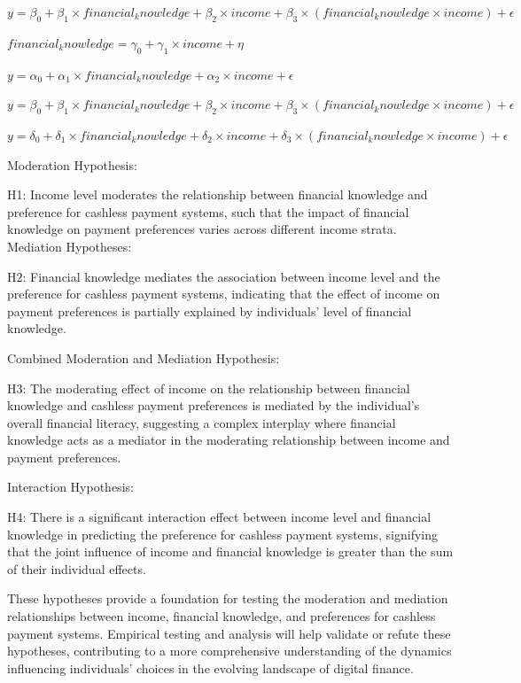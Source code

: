\documentclass[
  super,
  preprint,
  3p]{elsarticle}
\begin{document}
\({y} =\beta_0 + \beta_1 \times {financial_knowledge} + \beta_2 \times {income} + \beta_3 \times ({financial_knowledge} \times {income}) + \epsilon\)

\({financial_knowledge} = \gamma_0 + \gamma_1 \times {income} + \eta\)

\({y} = \alpha_0 + \alpha_1 \times {financial_knowledge} + \alpha_2 \times {income} + \epsilon\)

\({y} = \beta_0 + \beta_1 \times {financial_knowledge} + \beta_2 \times {income} + \beta_3 \times ({financial_knowledge} \times {income}) + \epsilon\)

\({y} = \delta_0 + \delta_1 \times {financial_knowledge} + \delta_2 \times {income} + \delta_3 \times (financial_knowledge \times {income}) + \epsilon\)

Moderation Hypothesis:

H1: Income level moderates the relationship between financial knowledge
and preference for cashless payment systems, such that the impact of
financial knowledge on payment preferences varies across different
income strata. Mediation Hypotheses:

H2: Financial knowledge mediates the association between income level
and the preference for cashless payment systems, indicating that the
effect of income on payment preferences is partially explained by
individuals' level of financial knowledge.

Combined Moderation and Mediation Hypothesis:

H3: The moderating effect of income on the relationship between
financial knowledge and cashless payment preferences is mediated by the
individual's overall financial literacy, suggesting a complex interplay
where financial knowledge acts as a mediator in the moderating
relationship between income and payment preferences.

Interaction Hypothesis:

H4: There is a significant interaction effect between income level and
financial knowledge in predicting the preference for cashless payment
systems, signifying that the joint influence of income and financial
knowledge is greater than the sum of their individual effects.

These hypotheses provide a foundation for testing the moderation and
mediation relationships between income, financial knowledge, and
preferences for cashless payment systems. Empirical testing and analysis
will help validate or refute these hypotheses, contributing to a more
comprehensive understanding of the dynamics influencing individuals'
choices in the evolving landscape of digital finance.
\end{document}
